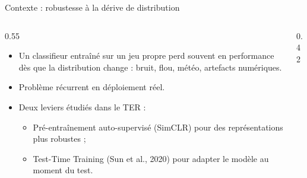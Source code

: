 \documentclass[10pt,aspectratio=169]{beamer}
\begin{document}
\begin{frame}{Contexte : robustesse à la dérive de distribution}
  \begin{columns}[T,onlytextwidth]
    \begin{column}{0.55\textwidth}
      \begin{itemize}
        \item Un classifieur entraîné sur un jeu propre perd souvent en performance dès que la distribution change : bruit, flou, météo, artefacts numériques.
        \item Problème récurrent en déploiement réel.
        \item Deux leviers étudiés dans le TER :
        \begin{itemize}
          \item \alert{Pré-entraînement auto-supervisé} (SimCLR) pour des représentations plus robustes ;
          \item \alert{Test-Time Training} (Sun et al., 2020) pour adapter le modèle au moment du test.
        \end{itemize}
      \end{itemize}
    \end{column}
    \begin{column}{0.42\textwidth}
      \centering
    \end{column}
  \end{columns}
\end{frame}
\end{document}
